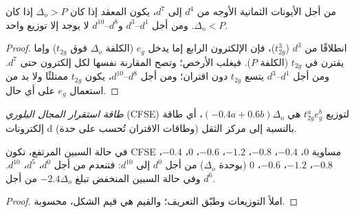 \begin{proposition}\label{prop:b2:ligand-field:spin-state}
من أجل الأيونات الثمانية الأوجه من $d^4$ إلى $d^7$، يكون المعقد  إذا كان $\Delta_o > P$ 
إذا كان $\Delta_o < P$. ومن أجل $d^1$--$d^3$ و$d^8$--$d^{10}$ لا يوجد إلا توزيع واحد.
\end{proposition}

\begin{proof}
انطلاقًا من $d^3$ ($t_{2g}^3$)، فإن الإلكترون الرابع إما يدخل $e_g$ (الكلفة $\Delta_o$ فوق
$t_{2g}$) وإما يقترن في $t_{2g}$ (الكلفة $P$). فيغلب الأرخص؛ وتصح المقارنة نفسها
لكل إلكترون حتى $d^7$. ومن أجل $d^1$--$d^3$ يتسع $t_{2g}$ دون اقتران؛
ومن أجل $d^8$--$d^{10}$، يكون $t_{2g}$ ممتلئًا ولا بد من استعمال $e_g$ على أي حال.
\end{proof}

\begin{definition}\label{def:b2:ligand-field:cfse}
\emph{طاقة استقرار المجال البلوري}
(CFSE) لتوزيع $t_{2g}^ae_g^b$ هي $(-0.4a + 0.6b)\Delta_o$، أي طاقة
إلكترونات d بالنسبة إلى مركز الثقل (وطاقات الاقتران تُحسب على حدة).
\end{definition}

\begin{proposition}\label{prop:b2:ligand-field:cfse}
في حالة السبين المرتفع، تكون CFSE مساوية $0$، $-0.4$، $-0.8$، $-1.2$، $-0.6$، $0$، $-0.4$، $-0.8$، $-1.2$،
$-0.6$، $0$ (بوحدة $\Delta_o$) من أجل $d^0$ إلى $d^{10}$: فتنعدم من أجل $d^0$، $d^5$، $d^{10}$. وفي حالة السبين
المنخفض تبلغ $-2.4\Delta_o$ من أجل $d^6$.
\end{proposition}

\begin{proof}
املأ التوزيعات وطبّق التعريف؛ والقيم هي قيم الشكل،
محسوبة.
\end{proof}

